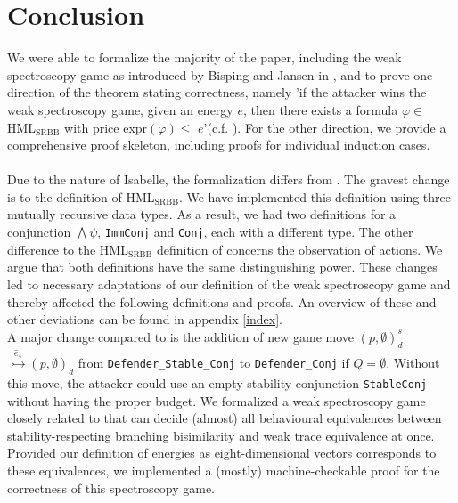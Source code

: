 \newpage
\section{Conclusion}
We were able to formalize the majority of the paper, including the weak spectroscopy game as introduced by Bisping and Jansen in \cite{bisping2023lineartimebranchingtime}, 
and to prove one direction of the theorem stating correctness, namely 'if the attacker wins the weak spectroscopy game, given an energy $e$, then there exists a formula $\varphi \in$ HML$_\text{SRBB}$ with price expr$(\varphi) \leq$ $e$'(c.f. \cite[lemma $2$, $3$]{bisping2023lineartimebranchingtime}). 
For the other direction, we provide a comprehensive proof skeleton, including proofs for individual induction cases.
\\\\
Due to the nature of Isabelle, the formalization differs from \cite{bisping2023lineartimebranchingtime}. The gravest change is to the definition of HML$_\text{SRBB}$. 
We have implemented this definition using three mutually recursive data types. As a result, we had two definitions for a conjunction $\bigwedge\psi$, 
\texttt{ImmConj} and \texttt{Conj}, each with a different type. 
The other difference to the HML$_\text{SRBB}$ definition of \cite{bisping2023lineartimebranchingtime} concerns the observation of actions. 
We argue that both definitions have the same distinguishing power. 
These changes led to necessary adaptations of our definition of the weak spectroscopy game and thereby affected the following definitions and proofs.
An overview of these and other deviations can be found in appendix \ref{index}. 
\\
A major change compared to \cite{bisping2023lineartimebranchingtime} is the addition of new game move $(p,\emptyset)_{d}^{s}$ $\overset{\hat{e}_4}{\rightarrowtail} (p,\emptyset)_d$ from \texttt{Defender\_Stable\_Conj} to \texttt{Defender\_Conj} if $Q = \emptyset$. 
Without this move, the attacker could use an empty stability conjunction \texttt{StableConj} without having the proper budget. 
We formalized a weak spectroscopy game closely related to \cite{bisping2023lineartimebranchingtime} that can decide (almost) all behavioural equivalences between stability-respecting branching bisimilarity and weak trace equivalence at once.
Provided our definition of energies as eight-dimensional vectors corresponds to these equivalences, we implemented a (mostly) machine-checkable proof for the correctness of this spectroscopy game.
\\\\
